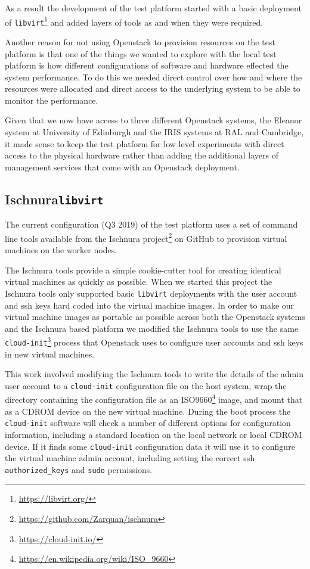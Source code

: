 \documentclass{article}
\newcommand{\openstack} {Openstack\xspace}
\newcommand{\ischnura} {Ischnura\xspace}
\newcommand{\libvirt} {\texttt{libvirt}\xspace}
\newcommand{\cloudinit} {\texttt{cloud-init}\xspace}
\newcommand{\github} {GitHub\xspace}
\newcommand{\cam} {Cambridge\xspace}
\newcommand{\ral} {RAL\xspace}
\newcommand{\iris} {IRIS\xspace}
\newcommand{\uedin} {University of Edinburgh\xspace}
\newcommand{\testplatform} {test platform\xspace}
\newcommand{\eleanor} {Eleanor\xspace}
\newcommand{\footurl}[1] {\footnote{\url{#1}}}
\begin{document}
As a result the development of the \testplatform started with a basic deployment of \libvirt\footurl{https://libvirt.org/} and added layers of tools as and when they were required.

Another reason for not using \openstack to provision resources on the \testplatform is that one of the things we wanted to explore with the local \testplatform is how different configurations of software and hardware effected the system performance. To do this we needed direct control over how and where the resources were allocated and direct access to the underlying system to be able to monitor the performance. 

Given that we now have access to three different \openstack systems, the \eleanor system at \uedin and the \iris systems at \ral and \cam, it made sense to keep the \testplatform for low level experiments with direct access to the physical hardware rather than adding the additional layers of management services that come with an \openstack deployment.

\subsection{\ischnura \libvirt}
\label{deployment.ischnura-libvirt}

The current configuration (Q3 2019) of the \testplatform uses a set of command line tools available from the \ischnura project\footurl{https://github.com/Zarquan/ischnura} on \github
to provision virtual machines on the worker nodes.

The \ischnura tools provide a simple cookie-cutter tool for creating identical virtual machines as quickly as possible.
When we started this project the \ischnura tools only supported basic \libvirt deployments with the user account and ssh keys hard coded into the virtual machine images.
In order to make our virtual machine images as portable as possible across both the \openstack systems and the \ischnura based platform we modified the \ischnura tools to use the same \cloudinit\footurl{https://cloud-init.io/} process that \openstack uses to configure user accounts and ssh keys in new virtual machines.

This work involved modifying the \ischnura tools to write the details of the admin user account to a \cloudinit configuration file on the host system, wrap the directory containing the configuration file as an ISO9660\footurl{https://en.wikipedia.org/wiki/ISO_9660} image, and mount that as a CDROM device on the new virtual machine. During the boot process the \cloudinit software will check a number of different options for configuration information, including a standard location on the local network or local CDROM device. If it finds some \cloudinit configuration data it will use it to configure the virtual machine admin account, including setting the correct ssh \texttt{authorized\_keys} and \texttt{sudo} permissions.
\end{document}
